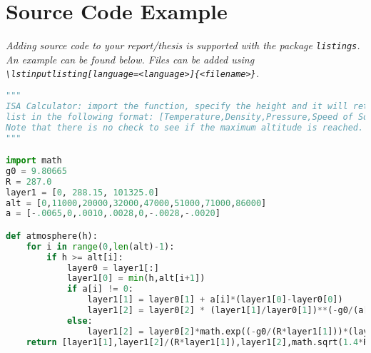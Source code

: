 \chapter{Source Code Example}

\emph{Adding source code to your report/thesis is supported with the package {\normalfont\texttt{listings}}. An example can be found below. Files can be added using {\normalfont\texttt{\textbackslash lstinputlisting[language=<language>]\{<filename>\}}}.}

\begin{lstlisting}[language=Python]
"""
ISA Calculator: import the function, specify the height and it will return a
list in the following format: [Temperature,Density,Pressure,Speed of Sound].
Note that there is no check to see if the maximum altitude is reached.
"""

import math
g0 = 9.80665
R = 287.0
layer1 = [0, 288.15, 101325.0]
alt = [0,11000,20000,32000,47000,51000,71000,86000]
a = [-.0065,0,.0010,.0028,0,-.0028,-.0020]

def atmosphere(h):
    for i in range(0,len(alt)-1):
        if h >= alt[i]:
            layer0 = layer1[:]
            layer1[0] = min(h,alt[i+1])
            if a[i] != 0:
                layer1[1] = layer0[1] + a[i]*(layer1[0]-layer0[0])
                layer1[2] = layer0[2] * (layer1[1]/layer0[1])**(-g0/(a[i]*R))
            else:
                layer1[2] = layer0[2]*math.exp((-g0/(R*layer1[1]))*(layer1[0]-layer0[0]))
    return [layer1[1],layer1[2]/(R*layer1[1]),layer1[2],math.sqrt(1.4*R*layer1[1])]
\end{lstlisting}
